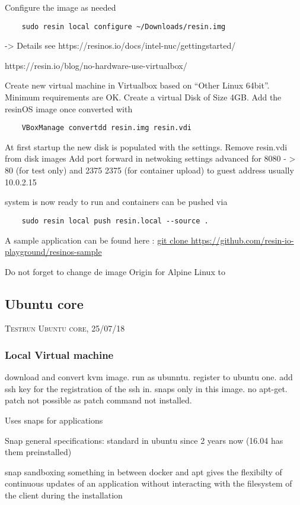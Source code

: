 \documentclass[]{scrartcl}
\begin{document}
Configure the image as needed
\begin{verbatim}
	sudo resin local configure ~/Downloads/resin.img
\end{verbatim}
-> Details see https://resinos.io/docs/intel-nuc/gettingstarted/


https://resin.io/blog/no-hardware-use-virtualbox/

Create new virtual machine in Virtualbox based on ``Other Linux 64bit''. Minimum requirements are OK.
Create a virtual Disk of Size 4GB. Add the resinOS image once converted with 
\begin{verbatim}
	VBoxManage convertdd resin.img resin.vdi
\end{verbatim}
At first startup the new disk is populated with the settings. Remove resin.vdi from disk images
Add port forward in netwoking settings advanced for 8080 - > 80 (for test only) and 2375 2375 (for container upload) to guest address usually 10.0.2.15

system is now ready to run and containers can be pushed via 
\begin{verbatim}
	sudo resin local push resin.local --source .
\end{verbatim}

A sample application can be found here : \url{git clone https://github.com/resin-io-playground/resinos-sample}

Do not forget to change de image Origin for Alpine Linux to 

\subsection{Ubuntu core}
{\small\textsc{Testrun Ubuntu core, 25/07/18} \bigskip}


\subsubsection{Local Virtual machine}
download and convert kvm image. run as ubunntu. register to ubuntu one. add ssh key for the registration of the ssh in. snaps only in this image. no apt-get. patch not possible as patch command not installed.

Uses snaps for applications

Snap general specifications:
standard in ubuntu since 2 years now (16.04 has them preinstalled)

snap sandboxing
something in between docker and apt
gives the flexibilty of continuous updates of an application without interacting with the filesystem of the client during the installation
\end{document}
